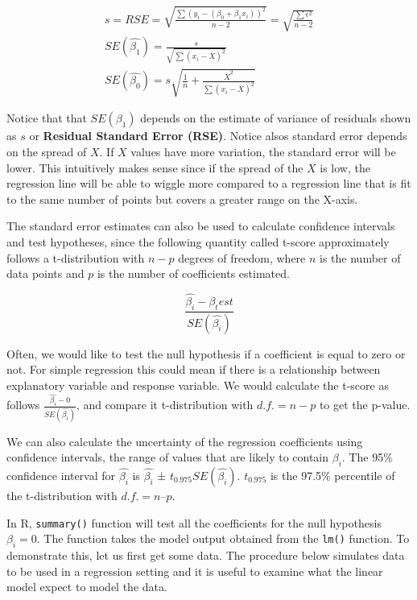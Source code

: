 \documentclass[12pt,]{krantz}
\theoremstyle{definition}
\theoremstyle{definition}
\theoremstyle{definition}
\theoremstyle{remark}
\begin{document}
\[
\begin{aligned}
s=RSE=\sqrt{\frac{\sum{(y_i-(\beta_0+\beta_1x_i))^2}}{n-2}  } =\sqrt{\frac{\sum{\epsilon^2}}{n-2}  } \\
SE(\hat{\beta_1})=\frac{s}{\sqrt{\sum{(x_i-\overline{X})^2}}} \\
SE(\hat{\beta_0})=s\sqrt{ \frac{1}{n} + \frac{\overline{X}^2}{\sum{(x_i-\overline{X})^2} }  }
\end{aligned}
\]

Notice that that \(SE(\beta_1)\) depends on the estimate of variance of
residuals shown as \(s\) or \textbf{Residual Standard Error (RSE)}.
Notice alsos standard error depends on the spread of \(X\). If \(X\)
values have more variation, the standard error will be lower. This
intuitively makes sense since if the spread of the \(X\) is low, the
regression line will be able to wiggle more compared to a regression
line that is fit to the same number of points but covers a greater range
on the X-axis.

The standard error estimates can also be used to calculate confidence
intervals and test hypotheses, since the following quantity called
t-score approximately follows a t-distribution with \(n-p\) degrees of
freedom, where \(n\) is the number of data points and \(p\) is the
number of coefficients estimated.

\[ \frac{\hat{\beta_i}-\beta_test}{SE(\hat{\beta_i})}\]

Often, we would like to test the null hypothesis if a coefficient is
equal to zero or not. For simple regression this could mean if there is
a relationship between explanatory variable and response variable. We
would calculate the t-score as follows
\(\frac{\hat{\beta_i}-0}{SE(\hat{\beta_i})}\), and compare it
t-distribution with \(d.f.=n-p\) to get the p-value.

We can also calculate the uncertainty of the regression coefficients
using confidence intervals, the range of values that are likely to
contain \(\beta_i\). The 95\% confidence interval for \(\hat{\beta_i}\)
is \(\hat{\beta_i}\) ± \(t_{0.975}SE(\hat{\beta_i})\). \(t_{0.975}\) is
the 97.5\% percentile of the t-distribution with \(d.f. = n – p\).

In R, \texttt{summary()} function will test all the coefficients for the
null hypothesis \(\beta_i=0\). The function takes the model output
obtained from the \texttt{lm()} function. To demonstrate this, let us
first get some data. The procedure below simulates data to be used in a
regression setting and it is useful to examine what the linear model
expect to model the data.
\end{document}
